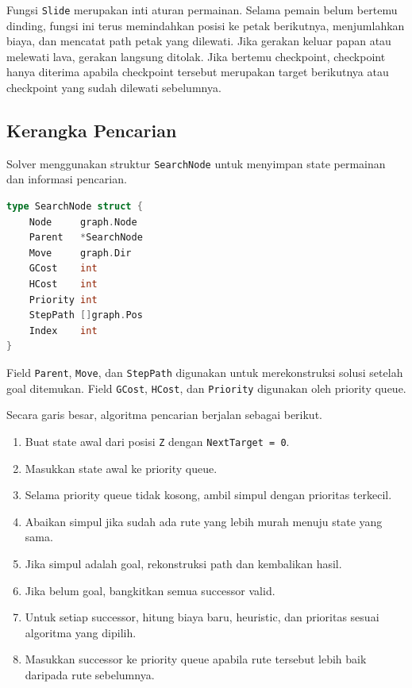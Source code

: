 Fungsi \texttt{Slide} merupakan inti aturan permainan. Selama pemain
belum bertemu dinding, fungsi ini terus memindahkan posisi ke petak
berikutnya, menjumlahkan biaya, dan mencatat path petak yang dilewati.
Jika gerakan keluar papan atau melewati lava, gerakan langsung
ditolak. Jika bertemu checkpoint, checkpoint hanya diterima apabila
checkpoint tersebut merupakan target berikutnya atau checkpoint yang
sudah dilewati sebelumnya.

\subsection{Kerangka Pencarian}\label{sub:Kerangka Pencarian}

Solver menggunakan struktur \texttt{SearchNode} untuk menyimpan state
permainan dan informasi pencarian.

\begin{lstlisting}[language=Go, basicstyle=\ttfamily\small, breaklines=true]
type SearchNode struct {
    Node     graph.Node
    Parent   *SearchNode
    Move     graph.Dir
    GCost    int
    HCost    int
    Priority int
    StepPath []graph.Pos
    Index    int
}
\end{lstlisting}

Field \texttt{Parent}, \texttt{Move}, dan \texttt{StepPath} digunakan
untuk merekonstruksi solusi setelah goal ditemukan. Field
\texttt{GCost}, \texttt{HCost}, dan \texttt{Priority} digunakan oleh
priority queue.

Secara garis besar, algoritma pencarian berjalan sebagai berikut.
\begin{enumerate}
    \item Buat state awal dari posisi \texttt{Z} dengan
        \texttt{NextTarget = 0}.
    \item Masukkan state awal ke priority queue.
    \item Selama priority queue tidak kosong, ambil simpul dengan
        prioritas terkecil.
    \item Abaikan simpul jika sudah ada rute yang lebih murah menuju
        state yang sama.
    \item Jika simpul adalah goal, rekonstruksi path dan kembalikan
        hasil.
    \item Jika belum goal, bangkitkan semua successor valid.
    \item Untuk setiap successor, hitung biaya baru, heuristic, dan
        prioritas sesuai algoritma yang dipilih.
    \item Masukkan successor ke priority queue apabila rute tersebut
        lebih baik daripada rute sebelumnya.
\end{enumerate}

